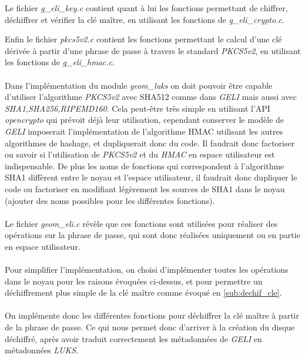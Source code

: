 Le fichier {\em g\_eli\_key.c} contient quant à lui les fonctions permettant de
chiffrer, déchiffrer et vérifier la clé maître, en utilisant les fonctions de
{\em g\_eli\_crypto.c}.

Enfin le fichier {\em pkcs5v2.c} contient les fonctions permettant le calcul
d'une clé dérivée à partir d'une phrase de passe à travers le standard
{\em PKCS5v2}, en utilisant les fonctions de {\em g\_eli\_hmac.c}.

\paragraph{}
Dans l'implémentation du module {\em geom\_luks} on doit pouvoir être capable
d'utiliser l'algorithme {\em PKCS5v2} avec SHA512 comme dans {\em GELI} mais
aussi avec {\em SHA1,SHA256,RIPEMD160}. Cela peut-être très simple en utilisant
l'API {\em opencrypto} qui prévoit déjà leur utilisation, cependant conserver
le modèle de {\em GELI} imposerait l'implémentation de l'algorithme HMAC utilisant
les autres algorithmes de hashage, et dupliquerait donc du code. Il faudrait
donc factoriser ou savoir si l'utilisation de {\em PKCS5v2} et du {\em HMAC}
en espace utilisateur est indispensable. De plus les noms de fonctions qui
correspondent à l'algorithme SHA1 diffèrent entre le noyau et l'espace
utilisateur, il faudrait donc dupliquer le code ou factoriser en modifiant
légèrement les sources de SHA1 dans le noyau (ajouter des noms possibles pour
les différentes fonctions).

\paragraph{}
Le fichier {\em geom\_eli.c} révèle que ces fonctions sont utilisées pour réaliser
des opérations sur la phrase de passe, qui sont donc réalisées uniquement ou
en partie en espace utilisateur.

\paragraph{}
Pour simplifier l'implémentation, on choisi d'implémenter toutes les opérations
dans le noyau pour les raisons évoquées ci-dessus, et pour permettre un 
déchiffrement plus simple de la clé maître comme évoqué en \ref{sub:dechif_cle}.
\paragraph{}
On implémente donc les différentes fonctions pour déchiffrer la clé maître à
partir de la phrase de passe. Ce qui nous permet donc d'arriver à la création
du disque déchiffré, après avoir traduit correctement les métadonnées de
{\em GELI} en métadonnées {\em LUKS}.

